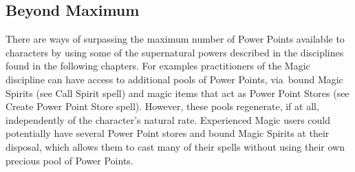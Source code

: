 \subsection{Beyond Maximum}
There are ways of surpassing the maximum number of Power Points available to characters by using some of the supernatural powers described in the disciplines found in the following chapters. For examples practitioners of the Magic discipline can have access to additional pools of Power Points, via bound Magic Spirits (see Call Spirit spell) and magic items that act as Power Point Stores (see Create Power Point Store spell). However, these pools regenerate, if at all, independently of the character’s natural rate. Experienced Magic users could potentially have several Power Point stores and bound Magic Spirits at their disposal, which allows them to cast many of their spells without using their own precious pool of Power Points.

